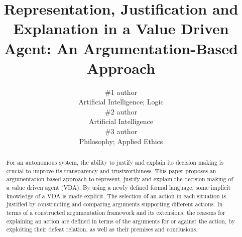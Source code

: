 \documentclass[letterpaper]{article} %
\begin{document}
%
\title{Representation, Justification and Explanation in a Value Driven Agent: An Argumentation-Based Approach}

\author{%
\#1 author\\
Artificial Intelligence; Logic \\
 \And
 \#2 author\\
Artificial Intelligence \\
 \And
 \#3 author\\
Philosophy; Applied Ethics
}

\maketitle
\begin{abstract}
For an autonomous system, the ability to justify and explain its decision making is crucial to improve its transparency and trustworthiness. This paper proposes an argumentation-based approach to represent, justify and explain the decision making of a value driven agent (VDA). By using a newly defined formal language, some implicit knowledge of a VDA is made explicit. The selection of an action in each situation is justified by constructing and comparing arguments supporting different actions. In terms of a constructed argumentation framework and its extensions, the reasons for explaining an action are defined in terms of the arguments for or against the action, by exploiting their defeat relation, as well as their premises and conclusions.  


\end{abstract}
\end{document}
